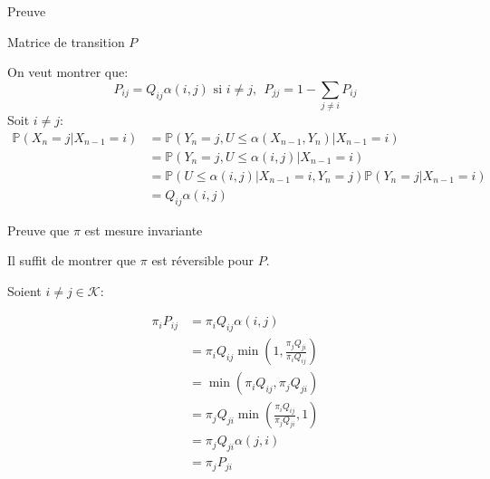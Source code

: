 \documentclass[9pt,ignorenonframetext,]{beamer}
\newcommand{\Pro}{\mathbb{P}}
\newcommand{\K}{\mathcal{K}}
\begin{document}
\begin{frame}{Preuve}
\protect\hypertarget{preuve}{}

\begin{block}{Matrice de transition \(P\)}

On veut montrer que:
\[P_{ij} = Q_{ij}\alpha(i, j)  \text{ si } i\neq j,~~ P_{jj} = 1 - \sum_{j\neq i} P_{ij}\]
\pause Soit \(i\neq j\): \begin{align*}
\Pro(X_{n} = j \vert X_{n -1} = i) &= \Pro\left(Y_{n} = j , U\leq \alpha(X_{n-1}, Y_{n})\vert X_{n -1} = i \right)\\
&=  \Pro\left(Y_{n} = j , U\leq \alpha(i, j)\vert X_{n -1} = i \right)\\
&=\Pro\left( U\leq \alpha(i, j)\vert X_{n -1} = i, Y_n = j \right)\Pro\left(Y_{n} = j \vert X_{n-1} = i\right)\\
&= Q_{ij}\alpha(i,j)
\end{align*}

\end{block}

\end{frame}

\begin{frame}{Preuve que \(\pi\) est mesure invariante}
\protect\hypertarget{preuve-que-pi-est-mesure-invariante}{}

Il suffit de montrer que \(\pi\) est réversible pour \(P\).

Soient \(i\neq j \in \K\):\pause 

\begin{align*}
\pi_iP_{ij} &=  \pi_i Q_{ij}\alpha(i, j)\\
&= \pi_i Q_{ij} \min\left(1, \frac{\pi_{j}Q_{ji}}{\pi_{i}Q_{ij}}\right)\\
&= \min\left(\pi_i Q_{ij}, \pi_{j}Q_{ji}\right)\\
&= \pi_{j}Q_{ji}\min\left(\frac{\pi_i Q_{ij}}{ \pi_{j}Q_{ji}}, 1 \right)\\
&= \pi_{j}Q_{ji}\alpha(j,i)\\
&=\pi_{j}P_{ji}
\end{align*}

\end{frame}
\end{document}
